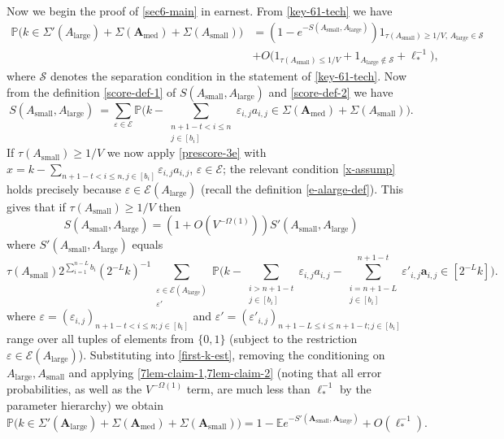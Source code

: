 \documentclass[11pt,reqno]{amsart}
\numberwithin{equation}{section}
\theoremstyle{definition}
\theoremstyle{remark}
\newcommand{\mb}{\mathbb}
\newcommand{\mbf}{\mathbf}
\newcommand{\eps}{\varepsilon}
\renewcommand{\le}{\leqslant}
\renewcommand{\ge}{\geqslant}
\def\sml{\operatorname{small}}
\def\lrg{\operatorname{large}}
\def\med{\operatorname{med}}
\begin{document}
Now we begin the proof of \cref{sec6-main} in earnest.
From \cref{key-61-tech} we have 
\begin{align} \nonumber \mb{P}\big(k \in \Sigma'(A_{\lrg}) + \Sigma(\mbf{A}_{\med}) + \Sigma(A_{\sml})\big) & = (1 - e^{-S(A_{\sml}, A_{\lrg})})1_{\tau(A_{\sml}) \ge 1/V,\, A_{\lrg} \in \mathscr{S}} \\  & + O\big(1_{\tau(A_{\sml}) \le 1/V} + 1_{A_{\lrg} \notin \mathscr{S}} + \ell_*^{-1}\big),\label{first-k-est}\end{align} where $\mathscr{S}$ denotes the separation condition in the statement of \cref{key-61-tech}.
Now from the definition \cref{score-def-1} of $S(A_{\sml}, A_{\lrg})$ and \cref{score-def-2} we have
\[ S(A_{\sml}, A_{\lrg})\ = \sum_{\eps \in \mathcal{E}} \mb{P} \big( k - \sum_{\substack{n +1 - t < i \le n \\ j \in [b_i]}} \eps_{i,j} a_{i,j} \in \Sigma(\mbf{A}_{\med}) + \Sigma(A_{\sml}) \big).\]
If $\tau(A_{\sml}) \ge 1/V$ we now apply \cref{prescore-3e} with $x = k - \sum_{n +1 - t < i \le n, j \in [b_i]} \eps_{i,j} a_{i,j}$, $\eps \in \mathcal{E}$; the relevant condition \cref{x-assump} holds precisely because $\eps \in \mathcal{E}(A_{\lrg})$ (recall the definition \cref{e-alarge-def}).  This gives that if $\tau(A_{\sml}) \ge 1/V$ then
\begin{equation*}  S(A_{\sml}, A_{\lrg}) = (1 + O(V^{-\Omega(1)})) S'(A_{\sml}, A_{\lrg}) \end{equation*} where $S'(A_{\sml}, A_{\lrg})$ equals
\begin{equation}\label{s-prime-def} \tau(A_{\sml})2^{\sum_{i=1}^{n - L} b_i}(2^{-L}k)^{-1} \sum_{\substack{\eps \in \mathcal{E}(A_{\lrg}) \\  \eps'}}  \mb{P} \Big(k - \sum_{\substack{i > n +1 - t \\ j \in [b_i]}} \eps_{i,j} a_{i,j}  - \sum_{\substack{i = n +1 - L  \\ j \in [b_i]}}^{n + 1 - t} \eps'_{i,j} \mathbf{a}_{i,j}  \in [2^{- L}k] \Big)  .\end{equation}
where $\eps = (\eps_{i,j})_{n +1 - t < i \le n;j \in [b_i]}$ and $\eps' = (\eps'_{i,j})_{n +1 - L \le i \le n +1 - t;j \in [b_i]}$ range over all tuples of elements from $\{0,1\}$ (subject to the restriction $\eps \in \mathcal{E}(A_{\lrg})$).
Substituting into \cref{first-k-est}, removing the conditioning on $A_{\lrg}, A_{\sml}$ and applying \cref{7lem-claim-1,7lem-claim-2} (noting that all error probabilities, as well as the $V^{-\Omega(1)}$ term, are much less than $\ell_*^{-1}$ by the parameter hierarchy) we obtain
\begin{equation}\label{preprop-72} \mb{P} \big(k \in \Sigma'(\mbf{A}_{\lrg}) + \Sigma(\mbf{A}_{\med}) + \Sigma(\mbf{A}_{\sml})\big) = 1 - \mb{E}e^{-S'(\mbf{A}_{\sml}, \mbf{A}_{\lrg})} +  O(\ell_*^{-1}).\end{equation}
\end{document}
